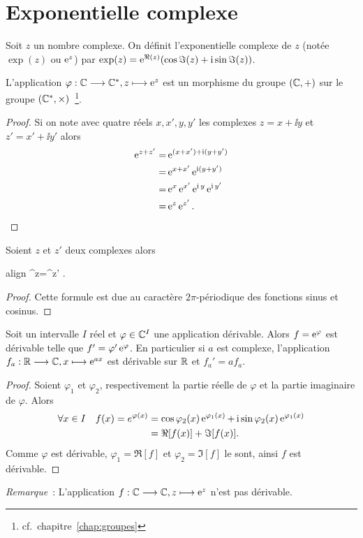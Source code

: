 \section{Exponentielle complexe}
\label{sec:expcomplexe}
\begin{defdef}
    Soit \(z\) un nombre complexe. On définit l'exponentielle complexe de \(z\) 
    (notée \(\exp(z)\) ou \(\operatorname{e}^z\)) par \(\exp(z)=\operatorname{e}^{\Re(z)}(\cos \Im(z) + \operatorname{i} 
    \sin \Im(z))\).
\end{defdef}
\begin{prop}
    L'application \(\varphi:\mathbb{C} \longrightarrow \mathbb{C}^*, z \longmapsto \operatorname{e}^z\) est un morphisme du 
    groupe \((\mathbb{C},+)\) sur le groupe \((\mathbb{C}^*,\times)\)~\footnote{cf.\ 
    chapitre~\ref{chap:groupes}}.
\end{prop}
\begin{proof}
    Si on note avec quatre réels \(x,x',y,y'\) les complexes \(z=x+\ii y\) et 
    \(z'=x'+\ii y'\) alors
    \begin{align}
        \operatorname{e}^{z+z'} =& \operatorname{e}^{(x+x') + \operatorname{i}(y+y')}\\
        =&\operatorname{e}^{x+x'} \operatorname{e}^{\operatorname{i} (y+y')}\\
        =& \operatorname{e}^{x} \operatorname{e}^{x'} \operatorname{e}^{\operatorname{i} y} \operatorname{e}^{\operatorname{i} y'}\\
        =& \operatorname{e}^z \operatorname{e}^{z'}.
    \end{align}
\end{proof}
\begin{prop}
    Soient \(z\) et \(z'\) deux complexes alors
    \begin{empheq}[box=\shadowbox*]{align}
        \e^z=\e^{z'} \iff {}.
    \end{empheq}
\end{prop}
\begin{proof}
    Cette formule est due au caractère \(2\pi\)-périodique des fonctions sinus 
    et cosinus.
\end{proof}
\begin{prop}
    Soit un intervalle \(I\) réel et \(\varphi \in \mathbb{C}^{I}\) une application 
    dérivable. Alors \(f=\operatorname{e}^\varphi\) est dérivable telle que \(f'=\varphi' 
    \operatorname{e}^\varphi\). En particulier si \(a\) est complexe, l'application 
    \(f_a:\mathbb{R} \longrightarrow \mathbb{C}, x \longmapsto \operatorname{e}^{ax}\) est dérivable sur \(\mathbb{R}\) et 
    \(f_a'=af_a\).
\end{prop}
\begin{proof}
    Soient \(\varphi_1\) et \(\varphi_2\), respectivement la partie réelle de 
    \(\varphi\) et la partie imaginaire de \(\varphi\). Alors
    \begin{align}
        \forall x \in I \quad f(x)=e^{\varphi(x)}&=\cos \varphi_2(x) 
        \operatorname{e}^{\varphi_1(x)}+ \operatorname{i} \sin \varphi_2(x)\operatorname{e}^{\varphi_1(x)} \\
                                                 &= \Re[f(x)] + \Im[f(x)].
    \end{align}
    Comme \(\varphi\) est dérivable, \(\varphi_1=\Re[f]\) et 
    \(\varphi_2=\Im[f]\) le sont, ainsi \(f\) est dérivable.
\end{proof}
\emph{Remarque}~: L'application \(f:\mathbb{C} \longrightarrow \mathbb{C}, z \longmapsto \operatorname{e}^z\) n'est pas 
dérivable.
